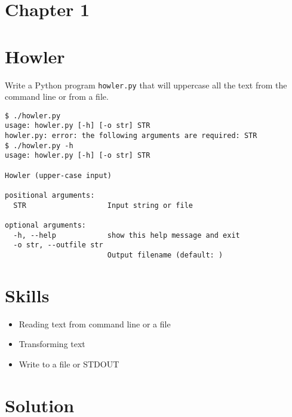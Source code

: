 \documentclass[]{article}
\date{}
\providecommand{\tightlist}{%
  \setlength{\itemsep}{0pt}\setlength{\parskip}{0pt}}
\begin{document}
\hypertarget{chapter-1}{%
\section{Chapter 1}\label{chapter-1}}

\hypertarget{howler}{%
\section{Howler}\label{howler}}

Write a Python program \texttt{howler.py} that will uppercase all the
text from the command line or from a file.

\begin{verbatim}
$ ./howler.py
usage: howler.py [-h] [-o str] STR
howler.py: error: the following arguments are required: STR
$ ./howler.py -h
usage: howler.py [-h] [-o str] STR

Howler (upper-case input)

positional arguments:
  STR                   Input string or file

optional arguments:
  -h, --help            show this help message and exit
  -o str, --outfile str
                        Output filename (default: )
\end{verbatim}

\hypertarget{skills}{%
\section{Skills}\label{skills}}

\begin{itemize}
\tightlist
\item
  Reading text from command line or a file
\item
  Transforming text
\item
  Write to a file or STDOUT
\end{itemize}

\pagebreak

\hypertarget{solution}{%
\section{Solution}\label{solution}}
\end{document}
